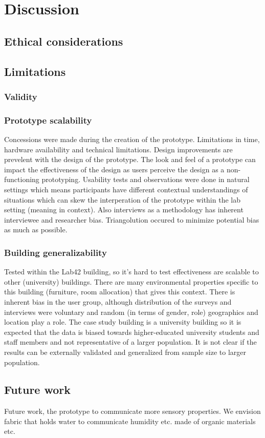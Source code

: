 \section{Discussion}
\label{sec:discussion}

\subsection{Ethical considerations}

\subsection{Limitations}

\subsubsection{Validity}


\subsubsection{Prototype scalability}
Concessions were made during the creation of the prototype. Limitations in time, hardware availability and technical limitations. Design improvements are prevelent with the design of the prototype. The look and feel of a prototype can impact the effectiveness of the design as users perceive the design as a non-functioning prototyping. Usability tests and observations were done in natural settings which means participants have different contextual understandings of situations which can skew the interperation of the prototype within the lab setting (meaning in context). Also interviews as a methodology has inherent interviewee and researcher bias. Triangolution occured to minimize potential bias as much as possible.

\subsubsection{Building generalizability}
Tested within the Lab42 building, so it's hard to test effectiveness are scalable to other (university) buildings. There are many environmental properties specific to this building (furniture, room allocation) that gives this context. There is inherent bias in the user group, although distribution of the surveys and interviews were voluntary and random (in terms of gender, role) geographics and location play a role. The case study building is a university building so it is expected that the data is biased towards higher-educated university students and staff members and not representative of a larger population. It is not clear if the results can be externally validated and generalized from sample size to larger population.

\subsection{Future work}

Future work, the prototype to communicate more sensory properties. We envision fabric that holds water to communicate humidity etc. made of organic materials etc.